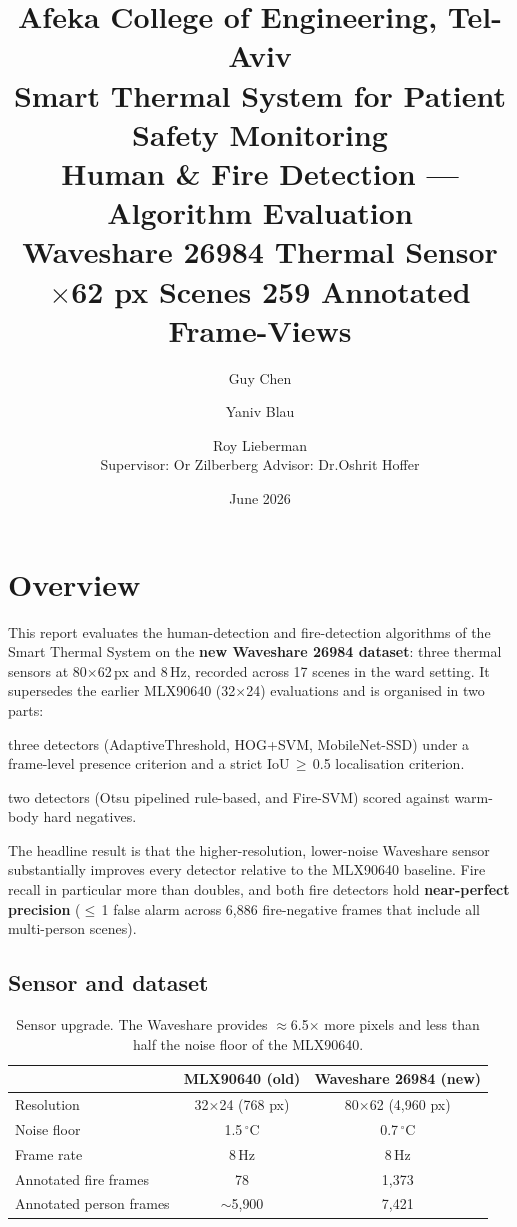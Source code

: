 \documentclass[11pt, a4paper]{article}
\title{%
    {\large Afeka College of Engineering, Tel-Aviv}\\[0.4em]
    {\large Smart Thermal System for Patient Safety Monitoring}\\[0.8em]
    {\LARGE\bfseries Human \& Fire Detection — Algorithm Evaluation}\\[0.4em]
    {\normalsize Waveshare 26984 Thermal Sensor \quad 80$\times$62 px \quad
     17 Scenes \quad 8{,}259 Annotated Frame-Views}
}
\author{%
    Guy Chen \and Yaniv Blau \and Roy Lieberman\\[0.3em]
    \small Supervisor: Or Zilberberg \qquad Advisor: Dr.\@ Oshrit Hoffer
}
\date{June 2026}
\begin{document}
\maketitle
\tableofcontents
\newpage

\section{Overview}

This report evaluates the human-detection and fire-detection algorithms of the
Smart Thermal System on the \textbf{new Waveshare 26984 dataset}: three thermal
sensors at 80$\times$62\,px and 8\,Hz, recorded across 17 scenes in the ward
setting. It supersedes the earlier MLX90640 (32$\times$24) evaluations and is
organised in two parts:

\begin{description}[leftmargin=2em, style=nextline]
    \item[Part I — Human Detection:] three detectors (AdaptiveThreshold,
        HOG+SVM, MobileNet-SSD) under a frame-level presence criterion and a
        strict IoU\,$\ge$\,0.5 localisation criterion.
    \item[Part II — Fire Detection:] two detectors (Otsu pipelined rule-based,
        and Fire-SVM) scored against warm-body hard negatives.
\end{description}

The headline result is that the higher-resolution, lower-noise Waveshare sensor
substantially improves every detector relative to the MLX90640 baseline. Fire
recall in particular more than doubles, and both fire detectors hold
\textbf{near-perfect precision} ($\le$\,1 false alarm across 6{,}886 fire-negative
frames that include all multi-person scenes).

\subsection{Sensor and dataset}

\begin{table}[H]
\centering
\caption{Sensor upgrade. The Waveshare provides $\approx$6.5$\times$ more pixels
and less than half the noise floor of the MLX90640.}
\renewcommand{\arraystretch}{1.3}
\begin{tabular}{lcc}
\toprule
 & \textbf{MLX90640 (old)} & \textbf{Waveshare 26984 (new)} \\
\midrule
Resolution     & 32$\times$24 (768 px) & 80$\times$62 (4{,}960 px) \\
Noise floor    & 1.5\,$^\circ$C        & 0.7\,$^\circ$C \\
Frame rate     & 8\,Hz                 & 8\,Hz \\
Annotated fire frames & 78             & 1{,}373 \\
Annotated person frames & $\sim$5{,}900 & 7{,}421 \\
\bottomrule
\end{tabular}
\end{table}
\end{document}
